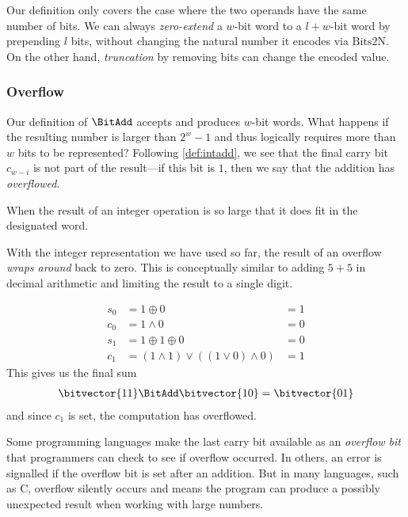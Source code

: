 Our definition only covers the case where the two operands have the
same number of bits.  We can always \emph{zero-extend} a $w$-bit word
to a $l+w$-bit word by prepending $l$ bits, without changing the
natural number it encodes via $\mathrm{Bits2N}$.  On the other hand,
\emph{truncation} by removing bits can change the encoded value.

\subsubsection{Overflow}
\label{sec:overflow}

Our definition of $\BitAdd$ accepts and produces $w$-bit words.  What
happens if the resulting number is larger than $2^{w}-1$ and thus
logically requires more than $w$ bits to be represented?  Following
\cref{def:intadd}, we see that the final carry bit $c_{w-i}$ is not
part of the result---if this bit is $1$, then we say that the addition
has \emph{overflowed}.

\begin{definition}
  When the result of an integer operation is so large that it does fit
  in the designated word.
\end{definition}

With the integer representation we have used so far, the result of an
overflow \emph{wraps around} back to zero.  This is conceptually
similar to adding $5+5$ in decimal arithmetic and limiting the result
to a single digit.

\begin{example}
  \begin{align}
    s_{0} &= 1 \oplus 0 &= 1 \\
    c_{0} &= 1 \land 0 &= 0 \\
    s_{1} &= 1 \oplus 1 \oplus 0 &= 0 \\
    c_{1} &= (1 \land 1) \lor ((1\lor 0) \land 0) &= 1
  \end{align}
  This gives us the final sum
  \begin{align}
    \bitvector{11} \BitAdd \bitvector{10} = \bitvector{01}
  \end{align}
  and since $c_{1}$ is set, the computation has overflowed.
\end{example}

Some programming languages make the last carry bit available as an
\emph{overflow bit} that programmers can check to see if overflow
occurred.  In others, an error is signalled if the overflow bit is set
after an addition.  But in many languages, such as C, overflow
silently occurs and means the program can produce a possibly
unexpected result when working with large numbers.

